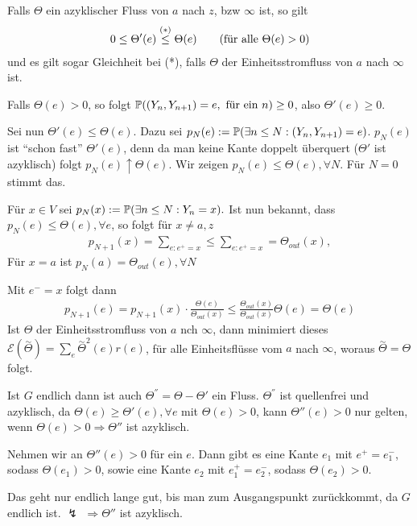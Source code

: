 \begin{satz}
	Falls $\Theta$ ein azyklischer Fluss von $a$ nach $z$, bzw $\infty$ ist, so gilt
	\begin{align}
		0 \leq \Theta'(e) \overset{(*)}{\leq} \Theta(e) \text{\qquad(für alle $\Theta(e) > 0$)}
	\end{align}
	und es gilt sogar Gleichheit bei (*), falls $\Theta$ der Einheitsstromfluss von $a$ nach $\infty$ ist.
\end{satz}
\begin{beweis}
	Falls $\Theta(e) > 0$, so folgt $\propE{(Y_n,Y_{n+1}) = e, \text{ für ein $n$}} \geq 0$, also $\Theta'(e) \geq 0$. 
	
	Sei nun $\Theta'(e) \leq \Theta(e).$ Dazu sei $p_N(e):= \propE{\exists n \leq N: (Y_n, Y_{n+1})  = e}$. $p_N(e)$ ist \enquote{schon fast} $\Theta'(e)$, denn da man keine Kante doppelt überquert ($\Theta'$ ist azyklisch) folgt $p_N(e) \uparrow \Theta(e)$. Wir zeigen $p_N(e) \leq \Theta(e), \forall N$. Für $N = 0$ stimmt das. 
	
	Für $x \in V$ sei $p_N(x) := \propE{\exists n \leq N: Y_n = x}.$ Ist nun bekannt, dass $p_N(e) \leq \Theta(e), \forall e$, so folgt für $x \neq a,z$
	\begin{align}
		p_{N+1}(x) = \sum\limits_{e:e^+=x} \leq \sum\limits_{e:e^+=x} =  \Theta_{out}(x),
	\end{align}
	Für $x=a$ ist $p_N(a) = \Theta_{out}(e), \forall N$
		
	Mit $e^-=x$ folgt dann 
	\begin{align}
		p_{N+1}(e) = p_{N+1}(x) \cdot \frac{\Theta(e)}{\Theta_{out}(x)} \leq \frac{\Theta_{out}(x)}{\Theta_{out}(x)}\Theta(e) = \Theta(e) 
	\end{align}
	Ist $\Theta$ der Einheitsstromfluss von $a$ nch $\infty$, dann minimiert dieses $\mathcal{E}(\overset{\sim}{\Theta}) = \sum\limits_{e} \overset{\sim}{\Theta}^2(e)r(e)$, für alle Einheitsflüsse vom $a$ nach $\infty$, woraus $\overset{\sim}{\Theta} = \Theta$ folgt.
	
	Ist $G$ endlich dann ist auch $\Theta^{''} = \Theta - \Theta'$ ein Fluss. $\Theta^{''}$ ist quellenfrei und azyklisch, da $\Theta(e) \geq \Theta'(e), \forall e$ mit $\Theta(e) > 0$, kann $\Theta''(e) > 0$ nur gelten, wenn $\Theta(e) > 0 \Rightarrow \Theta''$ ist azyklisch.
	
	Nehmen wir an $\Theta''(e) > 0$ für ein $e$. Dann gibt es eine Kante $e_1$ mit $e^+=e_1^-$, sodass $\Theta(e_1) > 0$, sowie eine Kante $e_2$ mit $e_1^+=e_2^-$, sodass $\Theta(e_2) > 0$.
	
	Das geht nur endlich lange gut, bis man zum Ausgangspunkt zurückkommt, da $G$ endlich ist. $\lightning$ $\Rightarrow \Theta''$ ist azyklisch. 
\end{beweis}

